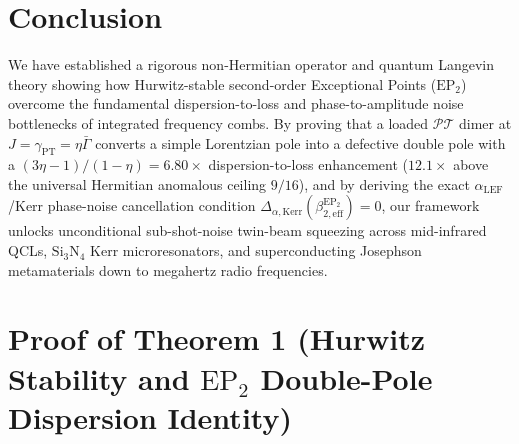 \documentclass[11pt,letterpaper]{article}
\theoremstyle{definition}
\theoremstyle{remark}
\begin{document}
\section{Conclusion}
\label{sec:conclusion}

We have established a rigorous non-Hermitian operator and quantum Langevin theory showing how Hurwitz-stable second-order Exceptional Points ($\mathrm{EP}_2$) overcome the fundamental dispersion-to-loss and phase-to-amplitude noise bottlenecks of integrated frequency combs. By proving that a loaded $\mathcal{PT}$ dimer at $J = \gamma_{\mathrm{PT}} = \eta\bar{\Gamma}$ converts a simple Lorentzian pole into a defective double pole with a $(3\eta - 1)/(1 - \eta) = 6.80\times$ dispersion-to-loss enhancement ($12.1\times$ above the universal Hermitian anomalous ceiling $9/16$), and by deriving the exact $\alpha_{\mathrm{LEF}}$/Kerr phase-noise cancellation condition $\Delta_{\alpha,\mathrm{Kerr}}(\beta_{2,\mathrm{eff}}^{\mathrm{EP}_2}) = 0$, our framework unlocks unconditional sub-shot-noise twin-beam squeezing across mid-infrared QCLs, $\mathrm{Si_3N_4}$ Kerr microresonators, and superconducting Josephson metamaterials down to megahertz radio frequencies.

\appendix

\section{Proof of Theorem 1 (Hurwitz Stability and $\mathrm{EP}_2$ Double-Pole Dispersion Identity)}
\label{app:proof_thm1}
\end{document}
